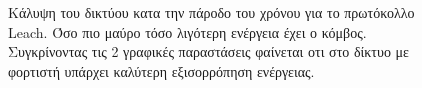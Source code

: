 \begin{figure}[H]
  \centering
  \caption{Κάλυψη του δικτύου κατα την πάροδο του χρόνου για το πρωτόκολλο Leach. Όσο πιο μαύρο τόσο λιγότερη ενέργεια έχει ο κόμβος. Συγκρίνοντας τις 2 γραφικές
παραστάσεις φαίνεται οτι στο δίκτυο με φορτιστή υπάρχει καλύτερη εξισορρόπηση ενέργειας.}
  \label{fig:5_1exp_4_2}
\end{figure}

